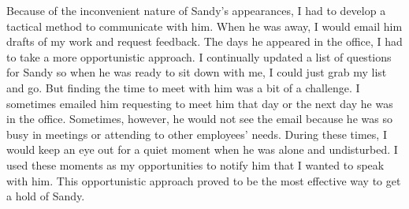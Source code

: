 
Because of the inconvenient nature of Sandy's appearances, I had to develop a tactical method to communicate with him.
When he was away, I would email him drafts of my work and request feedback.
The days he appeared in the office, I had to take a more opportunistic 
approach.
I continually updated a list of questions for Sandy so when he was ready to sit down with me, I could just grab my list and go.
But finding the time to meet with him was a bit of a challenge.
I sometimes emailed him requesting to meet him that day or the next day he was in the office.
Sometimes, however, he would not see the email because he was so busy in meetings or attending to other employees' needs.
During these times, I would keep an eye out for a quiet moment when he was alone and undisturbed.
I used these moments as my opportunities to notify him that I wanted to speak with him.
This opportunistic approach proved to be the most effective way to get a hold of Sandy.

